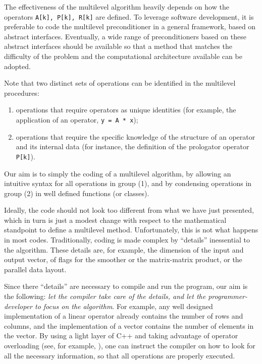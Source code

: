 \documentclass{article}[11pt]
\begin{document}
The effectiveness of the multilevel algorithm heavily depends on 
how the operators \verb!A[k], P[k], R[k]! are defined. To leverage software
development, it is preferable to code the multilevel preconditioner in a
general framework, based on abstract interfaces. Eventually, a  wide range
of preconditioners based on these abstract interfaces should be available so
that a method that matches the difficulty of the problem and the computational
architecture available can be adopted.

\smallskip

Note that two distinct sets of operations can be identified in the multilevel
procedures:
\begin{enumerate}
\item operations that require operators as unique identities (for example,
  the application of an operator, \verb!y = A * x!);
\item operations that require the specific knowledge of the structure
  of an operator and its internal data (for instance, the definition of the
  prologator operator \verb!P[k]!).
\end{enumerate}

Our aim is to simply the coding of a multilevel algorithm, by allowing
an intuitive syntax for all operations in group (1), and by condensing
operations in group (2) in well defined functions (or classes). 

Ideally, the code should not look too different from what we have just
presented, which in turn is just a modest change with respect to the
mathematical standpoint to define a multilevel method. Unfortunately, this is
not what happens in most codes.  Traditionally, coding is made complex by
``details'' inessential to the algorithm.  These details are, for example, the
dimension of the input and output vector, of flags for the smoother or the
matrix-matrix product, or the parallel data layout.

Since there ``details'' are necessary to compile and run the program, our aim
is the following: {\em let the compiler take care of the details, and let the
  programmer-developer to focus on the algorithm}. For example, any well
  designed implementation of a linear operator already contains the number of
  rows and columns, and the implementation of a vector contains the number of
  elements in the vector.  By using a light layer of C++ and taking advantage
  of operator overloading (see, for example, \cite{stroustrup91cpp}), one can
  instruct the compiler on how to look for all the necessary information, so
  that all operations are properly executed.
\end{document}
